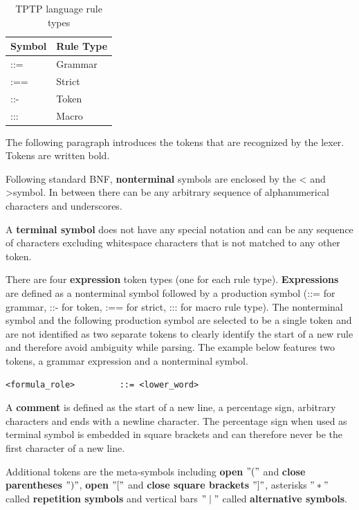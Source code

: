 \begin{table}[H]
\centering
\renewcommand{\arraystretch}{1}
\caption{\ac{TPTP} language rule types \cite{VS06}}
\begin{tabular}{ll}
\textbf{Symbol} & \textbf{Rule Type}\\\hline
::= & Grammar\\
:== & Strict\\
::- & Token\\
::: & Macro\\
\end{tabular}
\label{tbl:ConceptTPTPProductionSymbols}
\end{table}

The following paragraph introduces the tokens that are recognized by the lexer. Tokens are written bold.

Following standard \ac{BNF}, \textbf{nonterminal} symbols are enclosed by the \textless\; and \textgreater \;symbol.
In between there can be any arbitrary sequence of alphanumerical characters and underscores.

A \textbf{terminal symbol} does not have any special notation and can be any sequence of characters excluding whitespace characters that is not matched to any other token.

There are four \textbf{expression} token types (one for each rule type).
\textbf{Expressions} are defined as a nonterminal symbol followed by a production symbol (::= for grammar, ::- for token, :== for strict, ::: for macro rule type).
The nonterminal symbol and the following production symbol are selected to be a single token and are not identified as two separate tokens to clearly identify the start of a new rule and therefore avoid ambiguity while parsing.
The example below features two tokens, a grammar expression and a nonterminal symbol.
\begin{verbatim}
<formula_role>         ::= <lower_word>
\end{verbatim}

A \textbf{comment} is defined as the start of a new line, a percentage sign, arbitrary characters and ends with a newline character.
The percentage sign when used as terminal symbol is embedded in square brackets and can therefore never be the first character of a new line.

Additional tokens are the meta-symbols including \textbf{open} $"("$ and \textbf{close parentheses} $")"$, \textbf{open} $"["$ and \textbf{close square brackets} $"]"$, asterisks $"*"$ called \textbf{repetition symbols} and vertical bars $"\mid"$ called \textbf{alternative symbols}.

